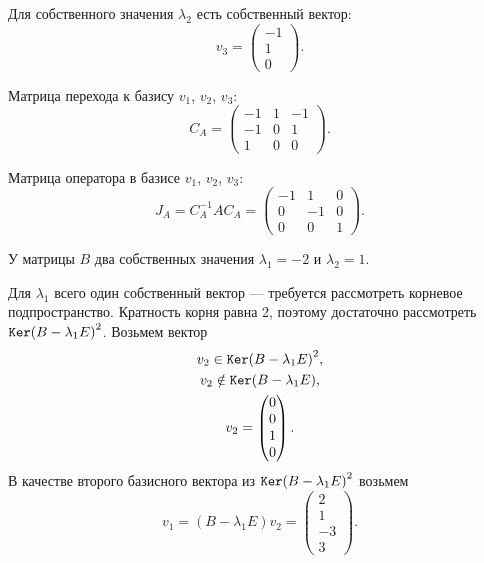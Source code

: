 \documentclass[12pt]{article}
\begin{document}
    Для собственного значения $\lambda_2$ есть собственный вектор:
    \[
        v_3 = \begin{pmatrix}
                  -1 \\ 1 \\ 0
        \end{pmatrix} .
    \]

    Матрица перехода к базису $v_1$, $v_2$, $v_3$:
    \[
        C_A =
        \begin{pmatrix}
            -1 & 1 & -1 \\
            -1 & 0 & 1  \\
            1  & 0 & 0
        \end{pmatrix}.
    \]

    Матрица оператора в базисе $v_1$, $v_2$, $v_3$:
    \[
        J_A
        = C_A^{-1} A C_A
        = \begin{pmatrix}
              -1 & 1  & 0 \\
              0  & -1 & 0 \\
              0  & 0  & 1
        \end{pmatrix}.
    \]

    У матрицы $B$ два собственных значения $\lambda_1 = -2$ и $\lambda_2 = 1$.

    Для $\lambda_1$ всего один собственный вектор --- требуется рассмотреть корневое подпространство. Кратность корня равна 2, поэтому достаточно рассмотреть
    $\mathtt{Ker}{\left ( B - \lambda_1 E \right )^2}$. Возьмем вектор
    \begin{gather*}
        v_2 \in \mathtt{Ker}{\left ( B - \lambda_1 E \right)^2}, \\
        v_2 \notin \mathtt{Ker}{\left ( B - \lambda_1 E \right)}, \\
        v_2 = \begin{pmatrix}
                  0 \\ 0 \\ 1 \\ 0
        \end{pmatrix}.
    \end{gather*}
    В качестве второго базисного вектора из $\mathtt{Ker}{\left ( B - \lambda_1 E \right )^2}$ возьмем
    \[
        v_1
        = \left ( B - \lambda_1 E \right ) v_2
        = \begin{pmatrix}
              2 \\ 1 \\ -3 \\ 3
        \end{pmatrix} .
    \]
\end{document}
